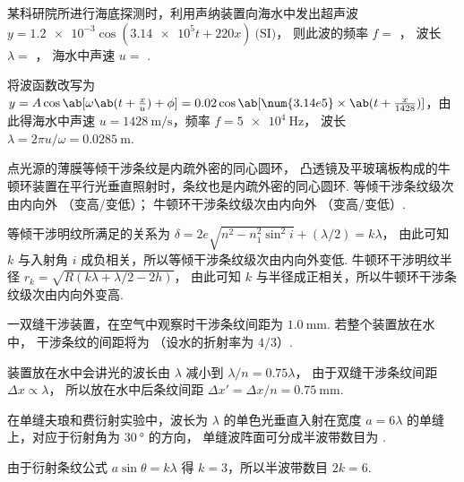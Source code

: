 \begin{problem}
  某科研院所进行海底探测时，利用声纳装置向海水中发出超声波 
  $y = \num{1.2e-3} \cos(\num{3.14e5} t + 220x)~\text{(SI)}$，
  则此波的频率 $f = $ ，
  波长 $\lambda = $ ，
  海水中声速 $u = $ .
\end{problem}
\scratch
\begin{solution}
  将波函数改写为
  $ y = A\cos\ab[\omega\ab(t + \frac xu) + \phi]
      = 0.02\cos\ab[\num{3.14e5} \times \ab(t + \frac{x}{1428})]
  $，由此得海水中声速 $u = \qty{1428}{\m/\s}$，频率 $f = \qty{5e4}{\Hz}$，
  波长 $\lambda = 2\pi u/\omega = \qty{0.0285}\m$.
\end{solution}

\begin{problem}
  点光源的薄膜等倾干涉条纹是内疏外密的同心圆环，
  凸透镜及平玻璃板构成的牛顿环装置在平行光垂直照射时，条纹也是内疏外密的同心圆环.
  等倾干涉条纹级次由内向外  （变高/变低）；
  牛顿环干涉条纹级次由内向外  （变高/变低）.
\end{problem}
\scratch
\begin{solution}
  等倾干涉明纹所满足的关系为
  $\delta = 2e\sqrt{n^2 - n_1^2\sin^2i} + (\lambda/2) = k\lambda$，
  由此可知 $k$ 与入射角 $i$ 成负相关，所以等倾干涉条纹级次由内向外变低.
  牛顿环干涉明纹半径 $r_k = \sqrt{R(k\lambda + \lambda/2 - 2h)}$，
  由此可知 $k$ 与半径成正相关，所以牛顿环干涉条纹级次由内向外变高.
\end{solution}

\begin{problem}
  一双缝干涉装置，在空气中观察时干涉条纹间距为 $\qty{1.0}\mm$. 若整个装置放在水中，
  干涉条纹的间距将为 （设水的折射率为 $4/3$）.
\end{problem}
\scratch
\begin{solution}
  装置放在水中会讲光的波长由 $\lambda$ 减小到 $\lambda/n = 0.75\lambda$，
  由于双缝干涉条纹间距 $\Delta x \propto \lambda$，
  所以放在水中后条纹间距 $\Delta x' = \Delta x/n = \qty{0.75}\mm$.
\end{solution}

\begin{problem}
  在单缝夫琅和费衍射实验中，波长为 $\lambda$ 的单色光垂直入射在宽度 $a = 6\lambda$
  的单缝上，对应于衍射角为 $\qty{30}\degree$ 的方向，
  单缝波阵面可分成半波带数目为 .
\end{problem}
\scratch
\begin{solution}
  由于衍射条纹公式 $a\sin\theta = k\lambda$ 得 $k = 3$，所以半波带数目 $2k = 6$.
\end{solution}

